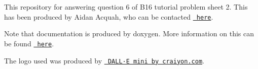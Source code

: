 This repository for answering question 6 of B16 tutorial problem sheet 2. This has been produced by Aidan Acquah, who can be contacted \href{mailto:aidan.acquah@eng.ox.ac.uk}{\texttt{ here}}.

Note that documentation is produced by doxygen. More information on this can be found \href{https://github.com/doxygen/doxygen}{\texttt{ here}}.

The logo used was produced by \href{https://www.craiyon.com/}{\texttt{ DALL·E mini by craiyon.\+com}}. 
